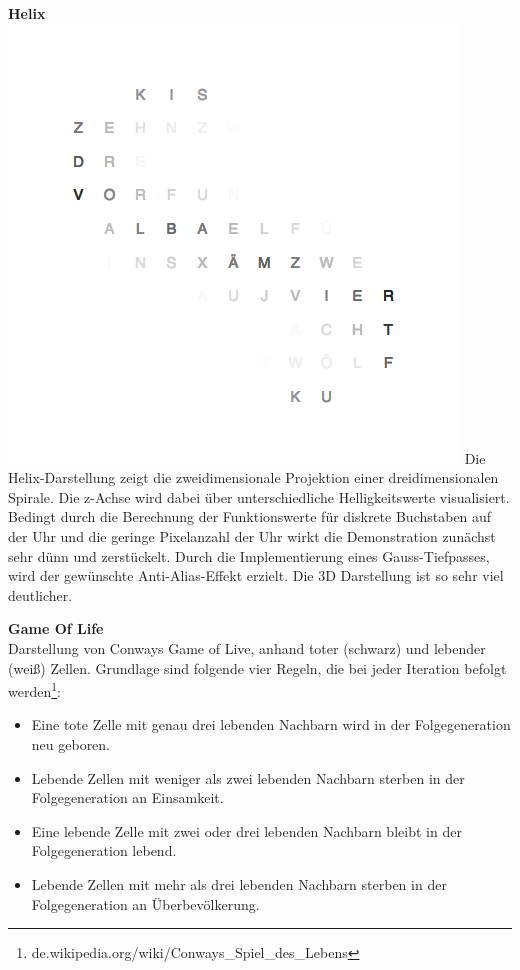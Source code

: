 \begin{multicols}{2}
\textbf{Helix} \\
\includegraphics[width=\columnwidth]{Abbildungen/Software/Demo/Helix}
Die Helix-Darstellung zeigt die zweidimensionale Projektion einer dreidimensionalen Spirale. Die z-Achse wird dabei über unterschiedliche Helligkeitswerte visualisiert.
Bedingt durch die Berechnung der Funktionswerte für diskrete Buchstaben auf der Uhr und die geringe Pixelanzahl der Uhr wirkt die Demonstration zunächst sehr dünn und zerstückelt. Durch die Implementierung eines Gauss-Tiefpasses, wird der gewünschte Anti-Alias-Effekt erzielt. Die 3D Darstellung ist so sehr viel deutlicher. 

\textbf{Game Of Life} \\
Darstellung von Conways Game of Live, anhand toter (schwarz) und lebender (weiß) Zellen. 
Grundlage sind folgende vier Regeln, die bei jeder Iteration befolgt werden\footnote{de.wikipedia.org/wiki/Conways\_Spiel\_des\_Lebens}:
\begin{itemize}
\item Eine tote Zelle mit genau drei lebenden Nachbarn wird in der Folgegeneration neu geboren.
\item Lebende Zellen mit weniger als zwei lebenden Nachbarn sterben in der Folgegeneration an Einsamkeit.
\item Eine lebende Zelle mit zwei oder drei lebenden Nachbarn bleibt in der Folgegeneration lebend.
\item Lebende Zellen mit mehr als drei lebenden Nachbarn sterben in der Folgegeneration an Überbevölkerung.
\end{itemize}


\end{multicols}
